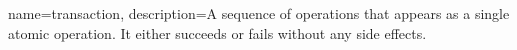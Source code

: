 %
%
%
%

{
    name=transaction,
    description={A sequence of operations that appears as a single atomic operation. It either succeeds or fails without any side effects.}
}
